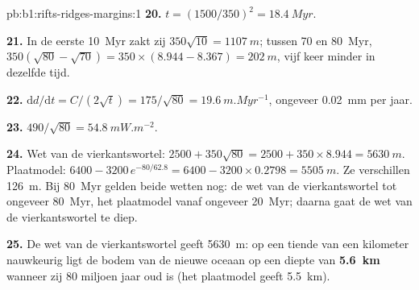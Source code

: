 \begin{solution}{pb:b1:rifts-ridges-margins:1}
\textbf{20.} $t = (1500/350)^2 = \qty{18.4}{Myr}$.

\textbf{21.} In de eerste \qty{10}{Myr} zakt zij $350\sqrt{10} = \qty{1107}{m}$;
tussen 70 en \qty{80}{Myr}, $350(\sqrt{80} - \sqrt{70}) = 350\times(8.944 -
8.367) = \qty{202}{m}$, vijf keer minder in dezelfde tijd.

\textbf{22.} $\mathrm dd/\mathrm dt = C/(2\sqrt t) = 175/\sqrt{80} =
\qty{19.6}{m.Myr^{-1}}$, ongeveer \qty{0.02}{mm} per jaar.

\textbf{23.} $490/\sqrt{80} = \qty{54.8}{mW.m^{-2}}$.

\textbf{24.} Wet van de vierkantswortel: $2500 + 350\sqrt{80} = 2500 + 350\times8.944 =
\qty{5630}{m}$. Plaatmodel: $6400 - 3200\,e^{-80/62.8} = 6400 - 3200\times0.2798
= \qty{5505}{m}$. Ze verschillen \qty{126}{m}. Bij \qty{80}{Myr} gelden beide
wetten nog: de wet van de vierkantswortel tot ongeveer \qty{80}{Myr}, het
plaatmodel vanaf ongeveer \qty{20}{Myr}; daarna gaat de wet van de
vierkantswortel te diep.

\textbf{25.} De wet van de vierkantswortel geeft \qty{5630}{m}: op een tiende van
een kilometer nauwkeurig ligt de bodem van de nieuwe oceaan op een diepte van
\textbf{\qty[text-series-to-math=true]{5.6}{km}} wanneer zij 80 miljoen jaar oud
is (het plaatmodel geeft \qty{5.5}{km}).
\end{solution}
